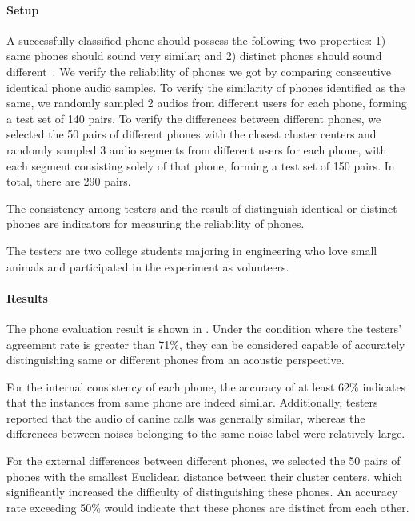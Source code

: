 \paragraph{Setup}

A successfully classified phone should possess the following two properties: 1) same phones should sound very similar; 
and 2) distinct phones should sound different~\citep{freeman1935phoneme}. 
We verify the reliability of phones we got by comparing consecutive identical phone audio samples.
To verify the similarity of phones identified as the same, we randomly sampled 2 audios from different users for
each phone, forming a test set of 140 pairs. To verify the differences between different phones,
we selected the 50 pairs of different phones with the closest cluster centers and randomly sampled 3 audio segments
from different users for each phone, with each segment consisting solely of that phone,
forming a test set of 150 pairs. In total, there are 290 pairs.

The consistency among testers and the result of distinguish identical or distinct phones are indicators for
measuring the reliability of phones.

The testers are two college students majoring in engineering who love small animals and participated in the experiment as volunteers.


\paragraph{Results}

The phone evaluation result is shown in .
Under the condition where the testers' agreement rate is greater than 71\%, 
they can be considered capable of accurately distinguishing same or different phones from an acoustic perspective.

For the internal consistency of each phone, the accuracy of at least 62\% indicates that
the instances from same phone are indeed similar.
Additionally, testers reported that the audio of canine calls was generally similar,
whereas the differences between noises belonging to the same noise label were relatively large.

For the external differences between different phones,
we selected the 50 pairs of phones with the smallest Euclidean distance between their cluster centers, which significantly increased the difficulty of distinguishing these phones. An accuracy rate exceeding 50\% would indicate that these phones are distinct from each other.

